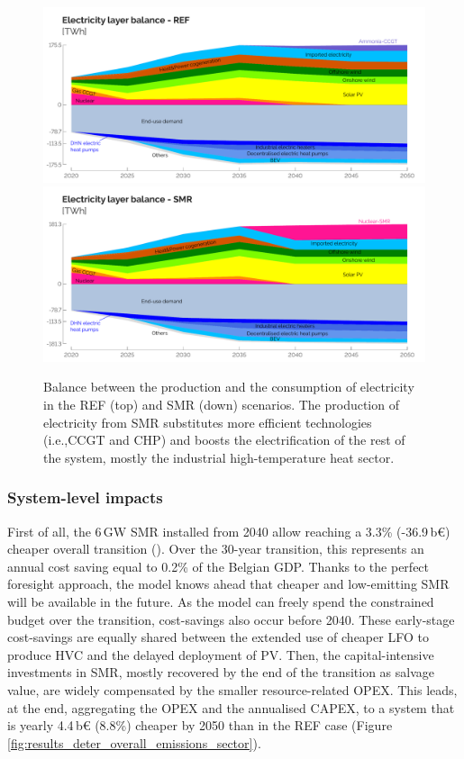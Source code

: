 \documentclass[11pt,twoside,a4paper,english]{article}
\def\ie{i.e.,}
\begin{document}
\begin{figure}[t!]
\centering
\includegraphics[width=\textwidth]{Elec_Layer_REF.pdf}
\includegraphics[width=\textwidth]{Elec_Layer_SMR.pdf}
\caption{Balance between the production and the consumption of electricity in the REF (top) and SMR (down) scenarios. The production of electricity from \gls{SMR} substitutes more efficient technologies (\ie \gls{CCGT} and \gls{CHP}) and boosts the electrification of the rest of the system, mostly the industrial high-temperature heat sector.}
\label{fig:results_deter_layer_elec}
\end{figure}

\newpage
\subsubsection{System-level impacts}
\label{subsubsec:atom_mol:results_deter_overall}
First of all, the 6\,GW \gls{SMR} installed from 2040 allow reaching a 3.3\% (-36.9\,b€) cheaper overall transition (). Over the 30-year transition, this represents an annual cost saving equal to 0.2\% of the Belgian GDP. Thanks to the perfect foresight approach, the model knows ahead that cheaper and low-emitting \gls{SMR} will be available in the future. As the model can freely spend the constrained  budget over the transition, cost-savings also occur before 2040. These early-stage cost-savings are equally shared between the extended use of cheaper \gls{LFO} to produce \gls{HVC} and the delayed deployment of \gls{PV}. Then, the capital-intensive investments in \gls{SMR}, mostly recovered by the end of the transition as salvage value, are widely compensated by the smaller resource-related OPEX. This leads, at the end, aggregating the OPEX and the annualised CAPEX, to a system that is yearly 4.4\,b€ (8.8\%) cheaper by 2050 than in the REF case (Figure \ref{fig:results_deter_overall_emissions_sector}).
\end{document}
